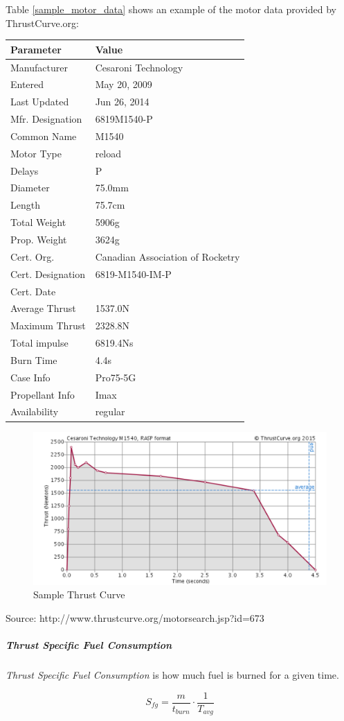 \documentclass[]{article}
\let\oldsubparagraph\subparagraph
\renewcommand{\subparagraph}[1]{\oldsubparagraph{#1}\mbox{}}
\begin{document}
Table \ref{sample_motor_data} shows an example of the motor data
provided by ThrustCurve.org:

\begin{longtable}[c]{@{}ll@{}}
\toprule
Parameter & Value\tabularnewline
\midrule
\endhead
Manufacturer & Cesaroni Technology\tabularnewline
Entered & May 20, 2009\tabularnewline
Last Updated & Jun 26, 2014\tabularnewline
Mfr. Designation & 6819M1540-P\tabularnewline
Common Name & M1540\tabularnewline
Motor Type & reload\tabularnewline
Delays & P\tabularnewline
Diameter & 75.0mm\tabularnewline
Length & 75.7cm\tabularnewline
Total Weight & 5906g\tabularnewline
Prop. Weight & 3624g\tabularnewline
Cert. Org. & Canadian Association of Rocketry\tabularnewline
Cert. Designation & 6819-M1540-IM-P\tabularnewline
Cert. Date &\tabularnewline
Average Thrust & 1537.0N\tabularnewline
Maximum Thrust & 2328.8N\tabularnewline
Total impulse & 6819.4Ns\tabularnewline
Burn Time & 4.4s\tabularnewline
Case Info & Pro75-5G\tabularnewline
Propellant Info & Imax\tabularnewline
Availability & regular\tabularnewline
\bottomrule
\end{longtable}


\begin{figure}[htbp]
\centering
\includegraphics{images/M1540_thrust_curve.png}
\caption{Sample Thrust Curve\label{thrust_curve_label}}
\end{figure}

Source: http://www.thrustcurve.org/motorsearch.jsp?id=673

\subparagraph{Thrust Specific Fuel
Consumption}\label{thrust-specific-fuel-consumption}

\emph{Thrust Specific Fuel Consumption} is how much fuel is burned for a
given time.

\begin{equation}
S_{fg} = \dfrac{m}{t_{burn}}\cdot \dfrac{1}{T_{avg}}  
\end{equation}
\end{document}
